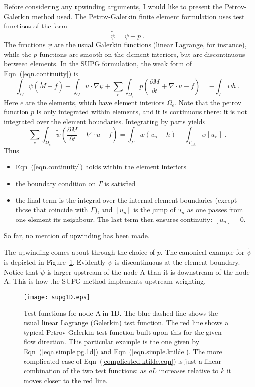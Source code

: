 \documentclass[]{scrreprt}
\begin{document}
Before considering any upwinding arguments, I would like to present
the Petrov-Galerkin method used.  The Petrov-Galerkin finite element
formulation uses test functions of the form
\begin{equation}
\tilde{\psi} = \psi + p \ .
\end{equation}
The functions $\psi$ are the usual Galerkin functions (linear
Lagrange, for instance), while the $p$ functions are smooth on the
element interiors, but are discontinuous between elements.  In the SUPG
formulation, the weak form of Eqn~(\ref{eqn.continuity}) is
\begin{equation}
\int_{\Omega}\psi (\dot{M} - f) - \int_{\Omega} u\cdot\nabla\psi
+ \sum_{e}\int_{\Omega_{e}}p \left( \frac{\partial M}{\partial t} + \nabla\cdot u
- f \right) = -\int_{\Gamma}w h \ .
\end{equation}
Here $e$ are the elements, which have element
interiors $\Omega_{e}$.  Note that the petrov function $p$ is only
integrated within elements, and it is continuous there: it is not
integrated over the element boundaries.  Integrating by parts yields
\begin{equation}
\sum_{e}\int_{\Omega_{e}}\tilde{\psi} \left( \frac{\partial M}{\partial t} + \nabla\cdot u
- f \right) = \int_{\Gamma}w (u_{n} - h) +
\int_{\Gamma_{\mathrm{int}}}w [u_{n}]\ .
\label{supg.general.eqn}
\end{equation}
Thus
\begin{itemize}
\item Eqn~(\ref{eqn.continuity}) holds within the element interiors
\item the boundary condition on $\Gamma$ is satisfied
\item the final term is the integral over the internal element
  boundaries (except those that coincide with $\Gamma$), and $[u_{n}]$
  is the jump of $u_{n}$ as one passes from one element its neighbour.
  The last term then ensures continuity: $[u_{n}] = 0$.
\end{itemize}
So far, no mention of upwinding has been made.

The upwinding comes about through the choice of $p$.  The canonical
example for $\tilde{\psi}$ is depicted in Figure~\ref{supg1D.fig}.
Evidently $\tilde{\psi}$ is discontinuous at the element boundary.
Notice that $\tilde{\psi}$ is larger upstream of the node A than it is
downstream of the node A.  This is how the SUPG method implements
upstream weighting.

\begin{figure}[htb]
\centering
\texttt{[image: supg1D.eps]}
\caption{Test functions for node A in 1D.  The blue dashed line shows the
  usual linear Lagrange (Galerkin) test function.  The red line shows
  a typical Petrov-Galerkin test function built upon this for the
  given flow direction.  This
  particular example is the one given by Eqn~(\ref{eqn.simple.pg.1d})
  and Eqn~(\ref{eqn.simple.ktilde}).  The more complicated case of
  Eqn~(\ref{complicated.ktilde.eqn}) is just a linear combination of
  the two test functions: as $aL$ increases relative to $k$ it moves
  closer to the red line.}
\label{supg1D.fig}
\end{figure}
\end{document}
